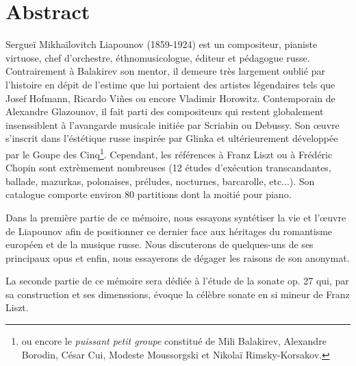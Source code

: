 
\chapter*{Abstract}

Sergueï Mikhaïlovitch Liapounov (1859-1924) est un compositeur, pianiste virtuose,
chef d'orchestre, éthnomusicologue, éditeur et pédagogue russe. Contrairement à
Balakirev son mentor, il demeure très largement oublié par l'histoire en dépit
de l'estime que lui portaient des artistes légendaires tels que Josef Hofmann,
Ricardo Vi\~{n}es ou encore Vladimir Horowitz.
Contemporain de Alexandre Glazounov, il fait parti des compositeurs qui restent
globalement insenssiblent à l'avangarde musicale initiée par Scriabin ou Debussy.
Son œuvre s'inscrit dans l'éstétique russe inspirée par Glinka et ultérieurement
développée par le Goupe des Cinq\footnote{ou encore le \emph{puissant petit groupe}
constitué de Mili Balakirev, Alexandre Borodin, César Cui, Modeste Moussorgski
et Nikolaï Rimsky-Korsakov.}. Cependant, les références à Franz Liszt ou à Frédéric
Chopin sont extrèmement nombreuses (12 études d'exécution transcandantes, ballade,
mazurkas, polonaises, préludes, nocturnes, barcarolle, etc...). Son catalogue
comporte environ 80 partitions dont la moitié pour piano.

Dans la première partie de ce mémoire, nous essayons syntétiser la vie et
l'œuvre de Liapounov afin de positionner ce dernier face aux héritages du
romantisme européen et de la musique russe. Nous discuterons de quelques-uns
de ses principaux opus et enfin, nous essayerons de dégager les raisons de son
anonymat.

La seconde partie de ce mémoire sera dédiée à l'étude de la sonate op. 27 qui,
par sa construction et ses dimenssions, évoque la célèbre sonate en si mineur
de Franz Liszt.

